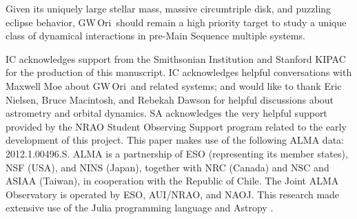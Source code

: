 \documentclass[twocolumn]{aastex61}
\newcommand{\obj}{GW\,Ori}
\begin{document}
Given its uniquely large stellar mass, massive circumtriple disk, and puzzling eclipse behavior, \obj\ should remain a high priority target to study a unique class of dynamical interactions in pre-Main Sequence multiple systems.

\acknowledgments
IC acknowledges support from the Smithsonian Institution and Stanford KIPAC for the production of this manuscript. IC acknowledges helpful conversations with Maxwell Moe about \obj\ and related systems; and would like to thank Eric Nielsen, Bruce Macintosh, and Rebekah Dawson for helpful discussions about astrometry and orbital dynamics. SA acknowledges the very helpful support provided by the NRAO Student Observing Support program related to the early development of this project.  This paper makes use of the following ALMA data: 2012.1.00496.S. ALMA is a partnership of ESO (representing its member states), NSF (USA), and NINS (Japan), together with NRC (Canada) and NSC and ASIAA (Taiwan), in cooperation with the Republic of Chile.  The Joint ALMA Observatory is operated by ESO, AUI/NRAO, and NAOJ.  This research made extensive use of the Julia programming language \citep{bezanson17} and Astropy \citep{astropy13}.





\end{document}
